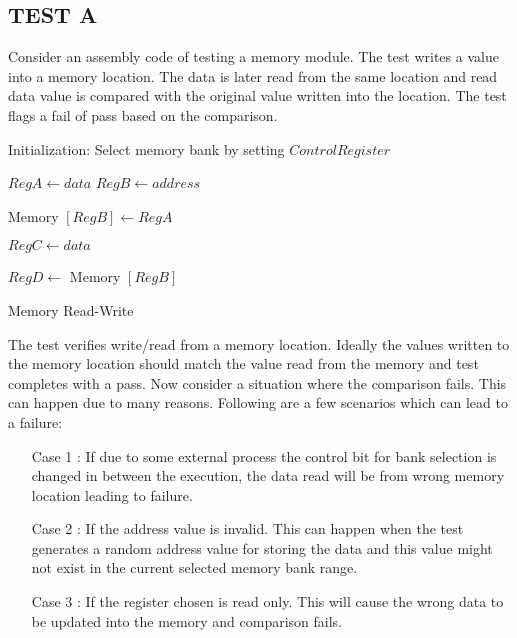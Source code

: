 \subsection {TEST A}
Consider an assembly code of testing a memory module. The test writes a value into a memory location. The data is later read from the same location and read data value is compared with the original value written into the location. The test flags a fail of pass based on the comparison.\\

\vspace{1.5cm}


\IncMargin{1em}
\begin{algorithm}[H]
\DontPrintSemicolon
{}

\BlankLine
Initialization: Select memory bank by setting $Control Register$ \;

	$Reg A \longleftarrow data$\;
	$Reg B \longleftarrow address$\;

	Memory $[Reg B] \longleftarrow Reg A $\;

	$Reg C \longleftarrow data$\;

	$Reg D \longleftarrow$	Memory $[Reg B]$\; 


\caption{Memory Read-Write}
\end{algorithm}\DecMargin{1em}

\vspace{1.5cm}
The test verifies write/read from a memory location. Ideally the values written to the memory location should match the value read from the memory and test completes with a pass. Now consider a situation where the comparison fails. This can happen due to many reasons. Following are a few scenarios which can lead to a failure:
\begin{itemize}
\item [Case 1]: If due to some external process the control bit for bank selection is changed in between the execution, the data read will be from wrong memory location leading to failure.

\item [Case 2]: If the address value is invalid. This can happen when the test generates a random address value for storing the data and this value might not exist in the current selected memory bank range.

\item [Case 3]:  If the register chosen is read only. This will cause the wrong data to be updated into the memory and comparison fails.
\end{itemize}

